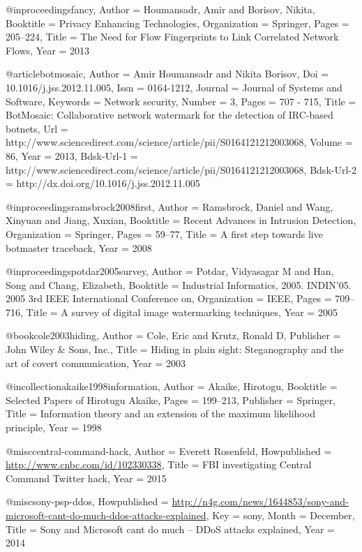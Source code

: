{{{{{{{	@inproceedings{fancy,
	Author = {Houmansadr, Amir and Borisov, Nikita},
	Booktitle = {Privacy Enhancing Technologies},
	Organization = {Springer},
	Pages = {205--224},
	Title = {The Need for Flow Fingerprints to Link Correlated Network Flows},
	Year = {2013}}
	
	@article{botmosaic,
	Author = {Amir Houmansadr and Nikita Borisov},
	Doi = {10.1016/j.jss.2012.11.005},
	Issn = {0164-1212},
	Journal = {Journal of Systems and Software},
	Keywords = {Network security},
	Number = {3},
	Pages = {707 - 715},
	Title = {BotMosaic: Collaborative network watermark for the detection of IRC-based botnets},
	Url = {http://www.sciencedirect.com/science/article/pii/S0164121212003068},
	Volume = {86},
	Year = {2013},
	Bdsk-Url-1 = {http://www.sciencedirect.com/science/article/pii/S0164121212003068},
	Bdsk-Url-2 = {http://dx.doi.org/10.1016/j.jss.2012.11.005}}
	
	@inproceedings{ramsbrock2008first,
	Author = {Ramsbrock, Daniel and Wang, Xinyuan and Jiang, Xuxian},
	Booktitle = {Recent Advances in Intrusion Detection},
	Organization = {Springer},
	Pages = {59--77},
	Title = {A first step towards live botmaster traceback},
	Year = {2008}}
	
	@inproceedings{potdar2005survey,
	Author = {Potdar, Vidyasagar M and Han, Song and Chang, Elizabeth},
	Booktitle = {Industrial Informatics, 2005. INDIN'05. 2005 3rd IEEE International Conference on},
	Organization = {IEEE},
	Pages = {709--716},
	Title = {A survey of digital image watermarking techniques},
	Year = {2005}}
	
	@book{cole2003hiding,
	Author = {Cole, Eric and Krutz, Ronald D},
	Publisher = {John Wiley \& Sons, Inc.},
	Title = {Hiding in plain sight: Steganography and the art of covert communication},
	Year = {2003}}
	
	@incollection{akaike1998information,
	Author = {Akaike, Hirotogu},
	Booktitle = {Selected Papers of Hirotugu Akaike},
	Pages = {199--213},
	Publisher = {Springer},
	Title = {Information theory and an extension of the maximum likelihood principle},
	Year = {1998}}
	
	@misc{central-command-hack,
	Author = {Everett Rosenfeld},
	Howpublished = {\url{http://www.cnbc.com/id/102330338}},
	Title = {{FBI investigating Central Command Twitter hack}},
	Year = {2015}}
	
	@misc{sony-psp-ddos,
	Howpublished = {\url{http://n4g.com/news/1644853/sony-and-microsoft-cant-do-much-ddos-attacks-explained}},
	Key = {sony},
	Month = {December},
	Title = {{Sony and Microsoft cant do much -- DDoS attacks explained}},
	Year = {2014}}
	
}}}}}}}
